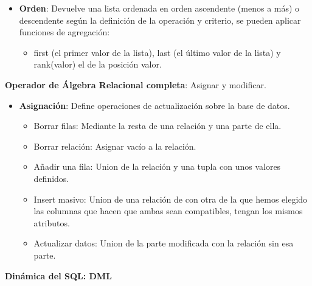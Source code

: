 \documentclass[12pt, twoside, openright]{report} %
\begin{document}
\begin{itemize}
  \item \textbf{Orden}: Devuelve una lista ordenada en orden ascendente
    (menos a más) o descendente según la definición de la operación y
    criterio, se pueden aplicar funciones de agregación:
    

    \begin{itemize}
    \item first (el primer valor de la lista), last (el último valor de la
      lista) y rank(valor) el de la posición valor.
      
    \end{itemize}
  \end{itemize}

  
  \textbf{Operador de Álgebra Relacional completa}: Asignar y modificar.
  

  \begin{itemize}
  \item \textbf{Asignación}: Define operaciones de actualización sobre la
    base de datos.
    

    \begin{itemize}
    \item Borrar filas: Mediante la resta de una relación y una parte de
      ella.
      
    \item Borrar relación: Asignar vacío a la relación.
      
    \item Añadir una fila: Union de la relación y una tupla con unos valores
      definidos.
      
    \item Insert masivo: Union de una relación de con otra de la que hemos
      elegido las columnas que hacen que ambas sean compatibles, tengan
      los mismos atributos.
      
    \item Actualizar datos: Union de la parte modificada con la relación sin
      esa parte.
      
    \end{itemize}
  \end{itemize}

  
  \textbf{Dinámica del SQL: DML}
  
\end{document}
